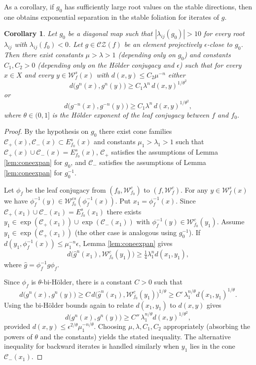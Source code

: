 \documentclass[11pt]{amsart}
\numberwithin{equation}{section}
\newcommand{\CZ}{\mathcal{CZ}}
\theoremstyle{plain}
\newtheorem{cor}[thm]{Corollary}
\begin{document}
As a corollary, if $g_0$ has sufficiently large root values on the
stable directions, then one obtains exponential separation in the stable
foliation for iterates of $g$.

\begin{cor}\label{cor:gexpandinEsf}
Let $g_0$ be a diagonal map such that
$|\lambda_{ij}(g_0)|>10$ for every root $\lambda_{ij}$ with $\lambda_{ij}(f_0)<0$. Let
$g\in\CZ(f)$ be an element projectively $\epsilon$-close to $g_0$. Then there
exist constants $\mu>\lambda>1$ (depending only on $g_0$) and constants
$C_1,C_2>0$ (depending only on the H\"older conjugacy and $\epsilon$)
such that for every $x\in X$ and every $y\in\mathcal W^s_f(x)$ with
$d(x,y)\le C_2\mu^{-n}$ either
\[
d\big(g^n(x),g^n(y)\big)\ge C_1\lambda^{n}\, d(x,y)^{1/\theta^2}
\] or \[
d\big(g^{-n}(x),g^{-n}(y)\big)\ge C_1\lambda^{n}\, d(x,y)^{1/\theta^2},
\]
where $\theta\in(0,1]$ is the H\"older exponent of the leaf conjugacy
between $f$ and $f_0$.
\end{cor}

\begin{proof}
By the hypothesis on $g_0$ there exist cone families  $\mathcal C_+(x),\mathcal C_-(x)\subset
E^s_{f_0}(x)$ and constants $\mu_1>\lambda_1>1$ such that
 $\mathcal C_+(x)\cup\mathcal C_-(x)=E^s_{f_0}(x)$,  $\mathcal C_+$ satisfies the assumptions of
Lemma \ref{lem:coneexpan} for $g_0$, and  $\mathcal C_-$ satisfies the assumptions
of Lemma \ref{lem:coneexpan} for $g_0^{-1}$.

Let  $\phi_f$ be the leaf conjugacy from $(f_0,\mathcal W^c_{f_0})$ to $(f,\mathcal W^c_f)$. For any $y\in\mathcal W^s_f(x)$ we have
 $\phi_f^{-1}(y)\in\mathcal W^{cs}_{f_0}(\phi_f^{-1}(x))$. Put  $x_1=\phi_f^{-1}(x)$. Since
 $\mathcal C_+(x_1)\cup\mathcal C_-(x_1)=E^s_{f_0}(x_1)$ there exists
 $y_1\in\exp(\mathcal C_+(x_1))\cup\exp(\mathcal C_-(x_1))$ with
 $\phi_f^{-1}(y)\in\mathcal W^c_{f_0}(y_1)$. Assume  $y_1\in\exp(\mathcal C_+(x_1))$ (the
other case is analogous using $g_0^{-1}$). If
 $d(y_1,\phi_f^{-1}(x))\le \mu_1^{-n}\epsilon$, Lemma \ref{lem:coneexpan}
gives
\[
d\big(\hat g^n(x_1),\mathcal W^c_{f_0}(y_1)\big)\ge \tfrac{1}{4}\lambda_1^n d(x_1,y_1),
\]
where  $\hat g=\phi_f^{-1} g\phi_f$.

Since  $\phi_f$ is $\theta$-bi-H\"older, there is a constant $C>0$ such that
\[
d\big(g^n(x),g^n(y)\big)
\ge C\,d\big(\hat g^n(x_1),\mathcal W^c_{f_0}(y_1)\big)^{1/\theta}
\ge C'\,\lambda_1^{n/\theta} d(x_1,y_1)^{1/\theta}.
\]
Using the bi-H\"older bounds again to relate $d(x_1,y_1)$ to $d(x,y)$
gives
\[
d\big(g^n(x),g^n(y)\big)\ge C''\,\lambda_1^{n/\theta} d(x,y)^{1/\theta^2},
\]
provided $d(x,y)\le \epsilon^{2/\theta}\mu_1^{-n/\theta}$. Choosing
$\mu,\lambda,C_1,C_2$ appropriately (absorbing the powers of $\theta$ and
the constants) yields the stated inequality. The alternative inequality
for backward iterates is handled similarly when $y_1$ lies in the cone
 $\mathcal C_-(x_1)$.
\end{proof}
\end{document}
